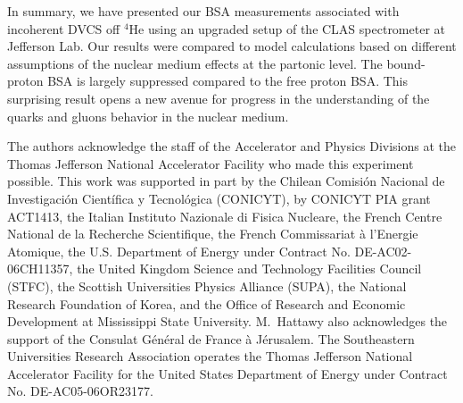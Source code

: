 \documentclass[twocolumn,nofootinbib,showpacs,prl,superscriptaddress,secnumarabic,amssymb,nobibnotes,aps,floatfix]{revtex4}
\begin{document}
In summary, we have presented our BSA measurements 
associated with incoherent DVCS off $^4$He using an upgraded setup of the CLAS 
spectrometer at Jefferson Lab. Our results were compared to model 
calculations based on different assumptions of the nuclear medium effects at 
the partonic level. The bound-proton BSA is largely suppressed compared to 
the free proton BSA. This surprising result opens a new avenue 
for progress in the understanding of the quarks and gluons behavior in the
nuclear medium.


The authors acknowledge the staff of the Accelerator and Physics Divisions at 
the Thomas Jefferson National Accelerator Facility who made this experiment 
possible. This work was supported in part by the Chilean Comisi\'on Nacional de 
Investigaci\'on Cient\'ifica y Tecnol\'ogica (CONICYT), by CONICYT PIA grant 
ACT1413, the Italian Instituto Nazionale di Fisica Nucleare, the French Centre 
National de la Recherche Scientifique, the French Commissariat \`a l'Energie 
Atomique, the U.S.  Department of Energy under Contract No. DE-AC02-06CH11357, 
the United Kingdom Science and Technology Facilities Council (STFC), the 
Scottish Universities Physics Alliance (SUPA), the National Research Foundation 
of Korea, and the Office of Research and Economic Development at Mississippi 
State University.  M.~Hattawy also acknowledges the support of the Consulat 
G\'en\'eral de France \`a J\'erusalem.  The Southeastern Universities Research 
Association operates the Thomas Jefferson National Accelerator Facility for the 
United States Department of Energy under Contract No. DE-AC05-06OR23177.
\end{document}
